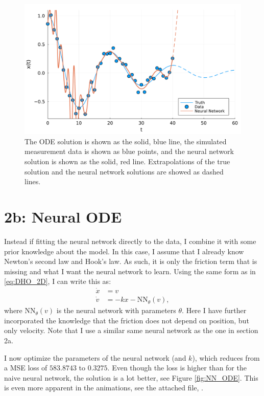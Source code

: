 \documentclass[10pt,a4paper]{article}
\begin{document}
\begin{figure}[H]
    \includegraphics[width=\linewidth]{no_ode_etxrapolated.pdf}
    \caption{The ODE solution is shown as the solid, blue line,
        the simulated measurement data is shown as blue points,
        and the neural network solution is shown as the solid, red line.
        Extrapolations of the true solution and the neural network solutions are showed as dashed lines.}
    \label{fig:NN_naive_extrapolation}
\end{figure}

\section*{2b: Neural ODE}

Instead if fitting the neural network directly to the data, I combine it with some prior knowledge about the model.
In this case, I assume that I already know Newton's second law and Hook's law.
As such, it is only the friction term that is missing and what I want the neural network to learn.
Using the same form as in \eqref{eq:DHO_2D}, I can write this as:
\begin{equation}
    \begin{split}
        \dot{x} &= v \\
        \dot{v} &= -kx - \mathrm{NN}_\theta(v),
    \end{split}
    \label{eq:DHO_2D_NN}
\end{equation}
where $\mathrm{NN}_\theta(v)$ is the neural network with parameters $\theta$.
Here I have further incorporated the knowledge that the friction does not depend on position, but only velocity.
Note that I use a similar same neural network as the one in section 2a.

I now optimize the parameters of the neural network (and $k$), which reduces from a MSE loss of $583.8743$ to $0.3275$.
Even though the loss is higher than for the naive neural network, the solution is a lot better, see Figure \ref{fig:NN_ODE}.
This is even more apparent in the animations, see the attached file, .
\end{document}

